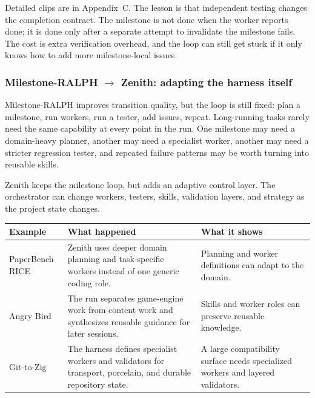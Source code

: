 \documentclass[11pt,a4paper]{article}
\renewcommand{\arraystretch}{1.18}
\newcommand{\code}[1]{#1}
\begin{document}
\vspace{6pt}

Detailed clips are in Appendix~C. The lesson is that independent testing changes the completion contract. The milestone is not done when the worker reports done; it is done only after a separate attempt to invalidate the milestone fails. The cost is extra verification overhead, and the loop can still get stuck if it only knows how to add more milestone-local issues.

\subsubsection{Milestone-RALPH $\rightarrow$ Zenith: adapting the harness itself}

Milestone-RALPH improves transition quality, but the loop is still fixed: plan a milestone, run workers, run a tester, add issues, repeat. Long-running tasks rarely need the same capability at every point in the run. One milestone may need a domain-heavy planner, another may need a specialist worker, another may need a stricter regression tester, and repeated failure patterns may be worth turning into reusable skills.

Zenith keeps the milestone loop, but adds an adaptive control layer. The orchestrator can change workers, testers, skills, validation layers, and strategy as the project state changes.

\begingroup
\renewcommand{\arraystretch}{1.25}
\setlength{\tabcolsep}{6pt}
\footnotesize
\noindent\begin{tabular}{@{}p{2.6cm}p{6.5cm}p{5.5cm}@{}}
\toprule
\rowcolor{tablehead}\textbf{\color{white}Example} & \textbf{\color{white}What happened} & \textbf{\color{white}What it shows} \\
\midrule
\code{PaperBench RICE} & Zenith uses deeper domain planning and task-specific workers instead of one generic coding role. & Planning and worker definitions can adapt to the domain. \\
\rowcolor{tableband}
\code{Angry Bird} & The run separates game-engine work from content work and synthesizes reusable guidance for later sessions. & Skills and worker roles can preserve reusable knowledge. \\
\code{Git-to-Zig} & The harness defines specialist workers and validators for transport, porcelain, and durable repository state. & A large compatibility surface needs specialized workers and layered validators. \\
\bottomrule
\end{tabular}
\endgroup
\end{document}
